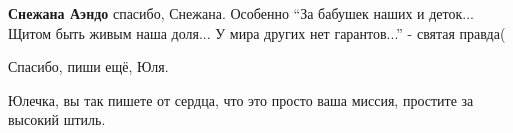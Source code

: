 \begin{itemize}
\begin{itemize} %
\textbf{Снежана Аэндо} спасибо, Снежана. Особенно \enquote{За бабушек наших и деток... Щитом быть живым наша доля...
У мира других нет гарантов...} - святая правда(
\end{itemize} %

Спасибо, пиши ещё, Юля.

Юлечка, вы так пишете от сердца, что это просто ваша миссия, простите за высокий штиль.

\end{itemize} %
